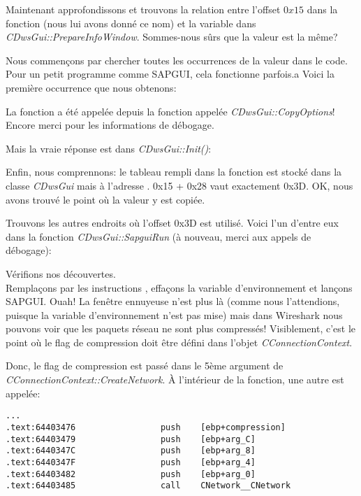 Maintenant approfondissons et trouvons la relation entre l'offset $0x15$ dans la
fonction  (nous lui avons donné ce nom) et la variable
 dans \emph{CDwsGui::PrepareInfoWindow}.
Sommes-nous sûrs que la valeur est la même?

Nous commençons par chercher toutes les occurrences de la valeur  dans le
code.
Pour un petit programme comme SAPGUI, cela fonctionne parfois.a Voici la première
occurrence que nous obtenons:



La fonction a été appelée depuis la fonction appelée \emph{CDwsGui::CopyOptions}!
Encore merci pour les informations de débogage.

Mais la vraie réponse est dans \emph{CDwsGui::Init()}:



Enfin, nous comprennons: le tableau rempli dans la fonction 
est stocké dans la classe \emph{CDwsGui} mais à l'adresse . 0x15 + 0x28
vaut exactement 0x3D. OK, nous avons trouvé le point où la valeur y est copiée.

Trouvons les autres endroits où l'offset 0x3D est utilisé.
Voici l'un d'entre eux dans la fonction \emph{CDwsGui::SapguiRun} (à nouveau, merci
aux appels de débogage):



Vérifions nos découvertes. \\
Remplaçons  par les instructions ,
effaçons la variable d'environnement \TDWNC et lançons SAPGUI. Ouah! La fenêtre ennuyeuse
n'est plus là (comme nous l'attendions, puisque la variable d'environnement n'est
pas mise) mais dans Wireshark nous pouvons voir que les paquets réseau ne sont plus
compressés!
Visiblement, c'est le point où le flag de compression doit être défini dans l'objet
\emph{CConnectionContext}.

Donc, le flag de compression est passé dans le 5ème argument de \emph{CConnectionContext::CreateNetwork}.
À l'intérieur de la fonction, une autre est appelée:

\begin{lstlisting}[style=customasmx86]
...
.text:64403476                 push    [ebp+compression]
.text:64403479                 push    [ebp+arg_C]
.text:6440347C                 push    [ebp+arg_8]
.text:6440347F                 push    [ebp+arg_4]
.text:64403482                 push    [ebp+arg_0]
.text:64403485                 call    CNetwork__CNetwork
\end{lstlisting}

